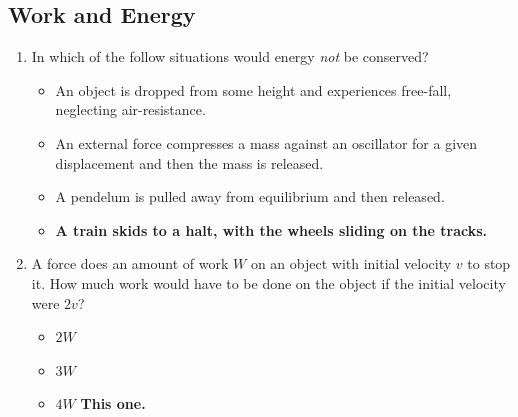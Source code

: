\documentclass[10pt]{article}
\begin{document}
\subsection{Work and Energy}
\begin{enumerate}
\item In which of the follow situations would energy \textit{not} be conserved?
\begin{itemize}
\item An object is dropped from some height and experiences free-fall, neglecting air-resistance.
\item An external force compresses a mass against an oscillator for a given displacement and then the mass is released.
\item A pendelum is pulled away from equilibrium and then released.
\item \textbf{A train skids to a halt, with the wheels sliding on the tracks.}
\end{itemize}
\item A force does an amount of work $W$ on an object with initial velocity $v$ to stop it.  How much work would have to be done on the object if the initial velocity were $2v$?
\begin{itemize}
\item $2W$
\item $3W$
\item $4W$ \textbf{This one.}
\end{itemize}
\end{enumerate}
\end{document}

